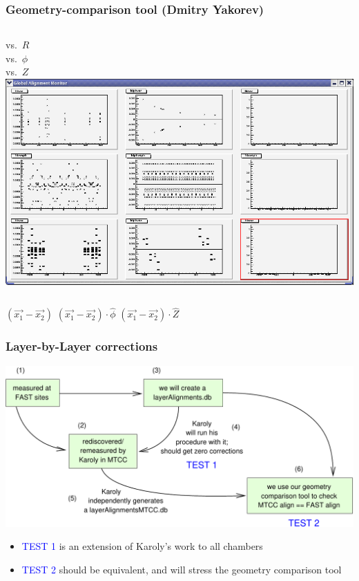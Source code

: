 \documentclass[compress]{beamer}
\begin{document}
\begin{frame}
\frametitle{Geometry-comparison tool (Dmitry Yakorev)}
\begin{columns}
vs.\ $R$ \\

\vspace{1 cm}
vs.\ $\phi$ \\

\vspace{1 cm}
vs.\ $Z$ \\
\includegraphics[width=\linewidth]{screen_shot.png}
\end{columns}

\vfill
\hfill $(\vec{x_1}-\vec{x_2})$ \hfill $(\vec{x_1}-\vec{x_2})\cdot\hat{\phi}$ \hfill $(\vec{x_1}-\vec{x_2})\cdot\hat{Z}$ \hfill
\end{frame}

\begin{frame}
\frametitle{Layer-by-Layer corrections}
\includegraphics[width=\linewidth]{layerbylayers}

\vfill
\begin{itemize}
\item \textcolor{blue}{TEST 1} is an extension of Karoly's work to all chambers
\item \textcolor{blue}{TEST 2} should be equivalent, and will stress the geometry comparison tool
\end{itemize}
\end{frame}
\end{document}
